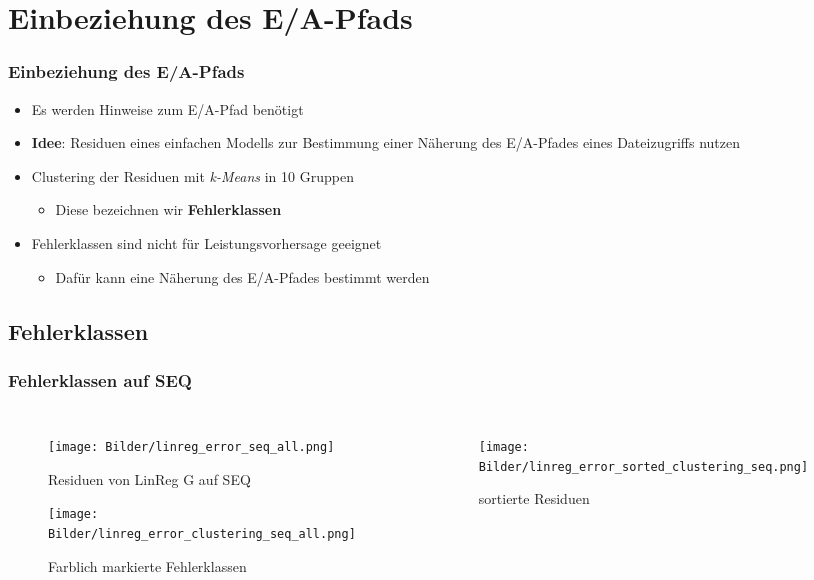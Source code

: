\documentclass{beamer}
\begin{document}
\section{Einbeziehung des E/A-Pfads}
\begin{frame}
\frametitle{Einbeziehung des E/A-Pfads}
\begin{itemize}
	\item Es werden Hinweise zum E/A-Pfad benötigt
	\item \textbf{Idee}: Residuen eines einfachen Modells zur Bestimmung einer Näherung des E/A-Pfades eines Dateizugriffs nutzen
	\item Clustering der Residuen mit \textit{k-Means} in 10 Gruppen
	\begin{itemize}
		\item Diese bezeichnen wir \textbf{Fehlerklassen} 
	\end{itemize}
	\item Fehlerklassen sind nicht für Leistungsvorhersage geeignet
	\begin{itemize}
		\item Dafür kann eine Näherung des E/A-Pfades bestimmt werden
	\end{itemize}
\end{itemize}
\end{frame}
\subsection{Fehlerklassen}
\begin{frame}
\frametitle{Fehlerklassen auf SEQ}
\begin{columns}
	\begin{figure}
		\texttt{[image: Bilder/linreg\_error\_seq\_all.png]}\\
		\vspace*{-0.45cm}
		\caption{Residuen von LinReg G auf SEQ}
		\texttt{[image: Bilder/linreg\_error\_clustering\_seq\_all.png]}\\
		\vspace*{-0.45cm}
		\caption{Farblich markierte Fehlerklassen}
	\end{figure}
	\begin{figure}		
		\texttt{[image: Bilder/linreg\_error\_sorted\_clustering\_seq.png]}
		\vspace*{-0.45cm}		
		\caption{sortierte Residuen}
	\end{figure}
\end{columns}
\end{frame}
\end{document}
